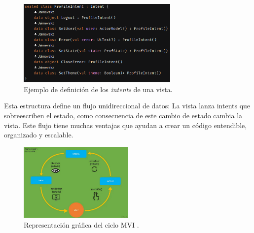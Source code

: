\begin{itemize}
    \begin{figure}[h]
        \centering
        \includegraphics[width = 0.7\textwidth]{Imagenes/Fuentes/ejemplo_intent.png}
        \caption{Ejemplo de definición de los \textit{intents} de una vista.}
        \label{fig:ejemplo_intent}
    \end{figure}
\end{itemize}
Esta estructura define un flujo unidireccional de datos: La vista lanza intents que sobreescriben el estado, como consecuencia de este cambio de estado cambia la vista. Este flujo tiene muchas ventajas que ayudan a crear un código entendible, organizado y escalable.
\begin{figure}[h]
    \centering
    \includegraphics[width = 0.5\textwidth]{Imagenes/Fuentes/visual_mvi.png}
    \caption{Representación gráfica del ciclo MVI \citep{mviExplanation}.}
    \label{fig:visualMvi}
\end{figure}

